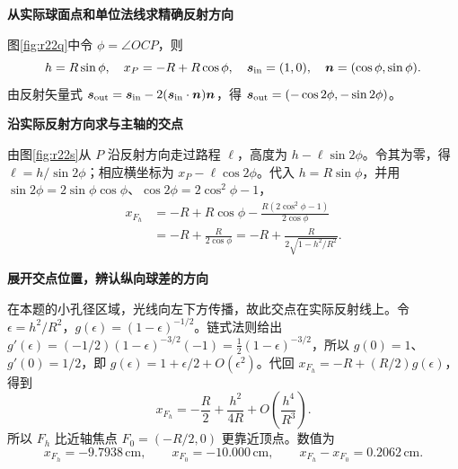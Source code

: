\begin{solution}\textbf{从实际球面点和单位法线求精确反射方向}\par\nobreak
图\ref{fig:r22q}中令 \(\phi=\angle OCP\)，则
\[
 h=R\sin\phi,\quad x_P=-R+R\cos\phi,\quad
 \boldsymbol s_{\rm in}=(1,0),\quad\boldsymbol n=(\cos\phi,\sin\phi).
\]
由反射矢量式 \(\boldsymbol s_{\rm out}=\boldsymbol s_{\rm in}
-2(\boldsymbol s_{\rm in}\cdot\boldsymbol n)\boldsymbol n\)，得
\(\boldsymbol s_{\rm out}=(-\cos2\phi,-\sin2\phi)\)。



\par\medskip{}\noindent\textbf{沿实际反射方向求与主轴的交点}\par\nobreak
由图\ref{fig:r22s}从 \(P\) 沿反射方向走过路程 $\ell$，高度为 $h-\ell\sin2\phi$。令其为零，得 $\ell=h/\sin2\phi$；相应横坐标为 $x_P-\ell\cos2\phi$。代入 $h=R\sin\phi$，并用 $\sin2\phi=2\sin\phi\cos\phi$、$\cos2\phi=2\cos^2\phi-1$，
\begin{align*}
 x_{F_h}&=-R+R\cos\phi-\frac{R(2\cos^2\phi-1)}{2\cos\phi}\\
 &=-R+\frac{R}{2\cos\phi}
 =\boxed{-R+\frac{R}{2\sqrt{1-h^2/R^2}}}.
\end{align*}


\par\medskip{}\noindent\textbf{展开交点位置，辨认纵向球差的方向}\par\nobreak
在本题的小孔径区域，光线向左下方传播，故此交点在实际反射线上。令 $\epsilon=h^2/R^2$，$g(\epsilon)=(1-\epsilon)^{-1/2}$。链式法则给出 $g'(\epsilon)=(-1/2)(1-\epsilon)^{-3/2}(-1)=\tfrac12(1-\epsilon)^{-3/2}$，所以 $g(0)=1$、$g'(0)=1/2$，即 $g(\epsilon)=1+\epsilon/2+O(\epsilon^2)$。代回 $x_{F_h}=-R+(R/2)g(\epsilon)$，得到
\[
 x_{F_h}=-\frac R2+\frac{h^2}{4R}
 +O\!\left(\frac{h^4}{R^3}\right).
\]
所以 \(F_h\) 比近轴焦点 \(F_0=(-R/2,0)\) 更靠近顶点。数值为
\[
 \boxed{x_{F_h}=-9.7938\,\mathrm{cm}},\qquad
 x_{F_0}=-10.000\,\mathrm{cm},\qquad
 \boxed{x_{F_h}-x_{F_0}=0.2062\,\mathrm{cm}}.
\]



\end{solution}
